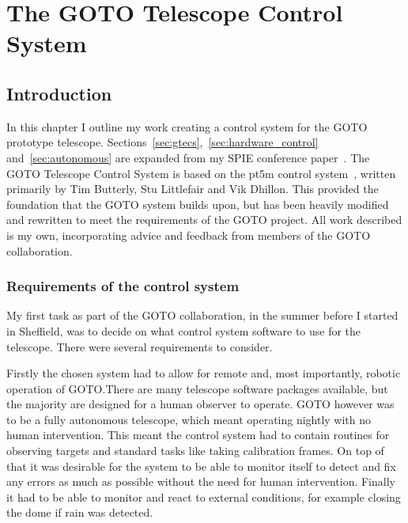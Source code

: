 \chapter{The GOTO Telescope Control System}
\label{chap:gtecs}
\chaptoc{}


\newpage
\section{Introduction}
\label{sec:gtecs_intro}
\begin{colsection}


\begin{colsection}

In this chapter I outline my work creating a control system for the GOTO prototype telescope. Sections~\ref{sec:gtecs},~\ref{sec:hardware_control} and~\ref{sec:autonomous} are expanded from my SPIE conference paper~\citet{Dyer}. The GOTO Telescope Control System is based on the pt5m control system~\citep{pt5m}, written primarily by Tim Butterly, Stu Littlefair and Vik Dhillon. This provided the foundation that the GOTO system builds upon, but has been heavily modified and rewritten to meet the requirements of the GOTO project. All work described is my own, incorporating advice and feedback from members of the GOTO collaboration.

\end{colsection}


\subsection{Requirements of the control system}
\label{sec:control_requirements}
\begin{colsection}

My first task as part of the GOTO collaboration, in the summer before I started in Sheffield, was to decide on what control system software to use for the telescope. There were several requirements to consider.

Firstly the chosen system had to allow for remote and, most importantly, robotic operation of GOTO.\@ There are many telescope software packages available, but the majority are designed for a human observer to operate. GOTO however was to be a fully autonomous telescope, which meant operating nightly with no human intervention. This meant the control system had to contain routines for observing targets and standard tasks like taking calibration frames. On top of that it was desirable for the system to be able to monitor itself to detect and fix any errors as much as possible without the need for human intervention. Finally it had to be able to monitor and react to external conditions, for example closing the dome if rain was detected.


\end{colsection}
\end{colsection}
